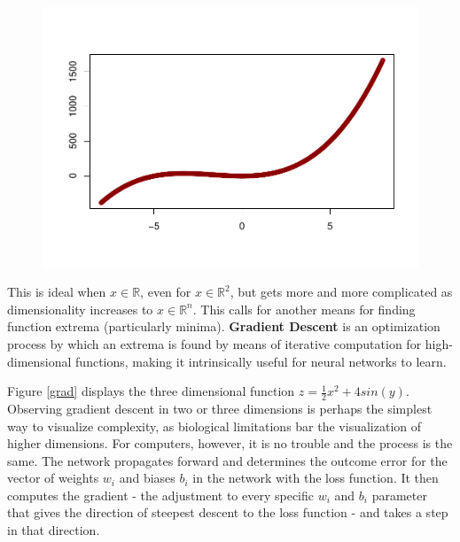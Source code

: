 \begin{figure}[H]
    \centering
    \includegraphics[width = .7\textwidth]{Figures/grad_desc_2D-1.pdf}
\end{figure}

This is ideal when \(x \in \mathbb{R}\), even for
\(x \in \mathbb{R}^2\), but gets more  and more complicated as
dimensionality increases to \(x \in \mathbb{R}^n\). This calls for
another means for finding function extrema (particularly minima).
\textbf{Gradient Descent} is an optimization process by which an extrema is found by
means of iterative computation for high-dimensional functions, making it
intrinsically useful for neural networks to learn.

Figure \ref{grad} displays the three dimensional function $z = \frac{1}{2} x^2 + 4 sin(y)$.  Observing gradient descent in two or three dimensions is perhaps the simplest way to visualize complexity, as biological limitations bar the visualization of higher dimensions.  For computers, however, it is no trouble and the process is the same.  The network propagates forward and determines the outcome error for the vector of weights $w_i$ and biases $b_i$ in the network with the loss function.  It then computes the gradient - the adjustment to every specific $w_i$ and $b_i$ parameter that gives the direction of steepest descent to the loss function - and takes a step in that direction.


